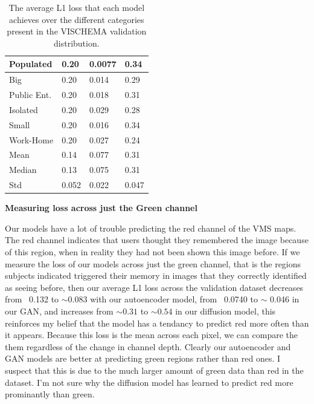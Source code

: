 \documentclass{UoYCSproject}
\begin{document}
\begin{table}[]
\begin{tabular}{|l|lll|}
        Populated              & \multicolumn{1}{l|}{0.20}        & \multicolumn{1}{l|}{0.0077}& 0.34                                   \\ \hline
        Big                    & \multicolumn{1}{l|}{0.20}        & \multicolumn{1}{l|}{0.014}& 0.29                                    \\ \hline
        Public Ent.            & \multicolumn{1}{l|}{0.20}        & \multicolumn{1}{l|}{0.018}& 0.31                                    \\ \hline
        Isolated               & \multicolumn{1}{l|}{0.20}        & \multicolumn{1}{l|}{0.029}& 0.28                                    \\ \hline
        Small                  & \multicolumn{1}{l|}{0.20}        & \multicolumn{1}{l|}{0.016}& 0.34                                    \\ \hline
        Work-Home              & \multicolumn{1}{l|}{0.20}        & \multicolumn{1}{l|}{0.027}& 0.24                                    \\ \hline
        \hline
        Mean                   & \multicolumn{1}{l|}{0.14}        & \multicolumn{1}{l|}{0.077}& 0.31                                    \\ \hline
        Median                 & \multicolumn{1}{l|}{0.13}        & \multicolumn{1}{l|}{0.075}& 0.31                                    \\ \hline
        Std                    & \multicolumn{1}{l|}{0.052}       & \multicolumn{1}{l|}{0.022}& 0.047                                   \\ \hline
    \end{tabular}
    \label{tab:categories}
    \caption{The average L1 loss that each model achieves over the different categories present in the VISCHEMA validation distribution.}
\end{table}

\textbf{Measuring loss across just the Green channel}

Our models have a lot of trouble predicting the red channel of the VMS maps. The red channel indicates that users thought they remembered the image because of this region, when in reality they had not been shown this image before. If we measure the loss of our models across just the green channel, that is the regions subjects indicated triggered their memory in images that they correctly identified as seeing before, 
then our average L1 loss across the validation dataset decreases from ~0.132 to \(\sim \)0.083 with our autoencoder model, 
from ~0.0740 to \(\sim \) 0.046 in our GAN, 
and increases from \(\sim 0.31 \) to \(\sim 0.54 \) in our diffusion model, this reinforces my belief that the model has a tendancy to predict red more often than it appears.
Because this loss is the mean across each pixel, we can compare the them regardless of the change in channel depth. Clearly our autoencoder and GAN models are better at predicting green regions rather than red ones. I suspect that this is due to the much larger amount of green data than red in the dataset. I'm not sure why the diffusion model has learned to predict red more prominantly than green.
\end{document}
